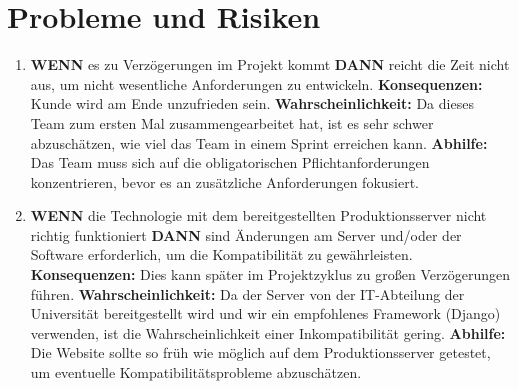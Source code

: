 \section{Probleme und Risiken}
\begin{enumerate}
	\item
    \textbf{WENN} es zu Verzögerungen im Projekt kommt \textbf{DANN} reicht die Zeit nicht aus, um nicht wesentliche Anforderungen zu entwickeln.
    \linebreak
    \linebreak
    \textbf{Konsequenzen:} Kunde wird am Ende unzufrieden sein.
    \linebreak
    \linebreak
    \textbf{Wahrscheinlichkeit:}  Da dieses Team zum ersten Mal zusammengearbeitet hat, ist es sehr schwer abzuschätzen, wie viel das Team in einem Sprint erreichen kann.
    \linebreak
    \linebreak
    \textbf{Abhilfe:} Das Team muss sich auf die obligatorischen Pflichtanforderungen konzentrieren, bevor es an zusätzliche Anforderungen fokusiert.
    \linebreak

    \item
    \textbf{WENN} die Technologie mit dem bereitgestellten Produktionsserver nicht richtig funktioniert \textbf{DANN} sind Änderungen am Server und/oder der Software erforderlich, um die Kompatibilität zu gewährleisten.
    \linebreak
    \linebreak
    \textbf{Konsequenzen:} Dies kann später im Projektzyklus zu großen Verzögerungen führen.
    \linebreak
    \linebreak
    \textbf{Wahrscheinlichkeit:} Da der Server von der IT-Abteilung der Universität bereitgestellt wird und wir ein empfohlenes Framework (Django) verwenden, ist die Wahrscheinlichkeit einer Inkompatibilität gering.
    \linebreak
    \linebreak
    \textbf{Abhilfe:} Die Website sollte so früh wie möglich auf dem Produktionsserver getestet, um eventuelle Kompatibilitätsprobleme abzuschätzen.
    \linebreak
    

\end{enumerate}

